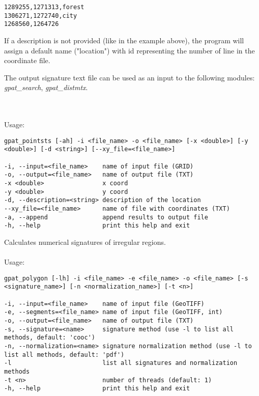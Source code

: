 \begin{minipage}{\linewidth}
\begin{lstlisting}
1289255,1271313,forest
1306271,1272740,city
1268560,1264726
\end{lstlisting}
\end{minipage}

If a description is not provided (like in the example above), the program will assign a default name ("location") with id representing the number of line in the coordinate file.

The output signature text file can be used as an input to the following modules: {\it gpat\_search}, {\it gpat\_distmtx}.

{}
\\\\
Usage:

\begin{minipage}{\linewidth}
\begin{lstlisting}
gpat_pointsts [-ah] -i <file_name> -o <file_name> [-x <double>] [-y <double>] [-d <string>] [--xy_file=<file_name>]

-i, --input=<file_name>    name of input file (GRID)
-o, --output=<file_name>   name of output file (TXT)
-x <double>                x coord
-y <double>                y coord
-d, --description=<string> description of the location
--xy_file=<file_name>      name of file with coordinates (TXT)
-a, --append               append results to output file
-h, --help                 print this help and exit
\end{lstlisting}
\end{minipage}

Calculates numerical signatures of irregular regions.
\\\\
Usage:

\begin{minipage}{\linewidth}
\begin{lstlisting}
gpat_polygon [-lh] -i <file_name> -e <file_name> -o <file_name> [-s <signature_name>] [-n <normalization_name>] [-t <n>]

-i, --input=<file_name>    name of input file (GeoTIFF)
-e, --segments=<file_name> name of input file (GeoTIFF, int)
-o, --output=<file_name>   name of output file (TXT)
-s, --signature=<name>     signature method (use -l to list all methods, default: 'cooc')
-n, --normalization=<name> signature normalization method (use -l to list all methods, default: 'pdf')
-l                         list all signatures and normalization methods
-t <n>                     number of threads (default: 1)
-h, --help                 print this help and exit
\end{lstlisting}
\end{minipage}

